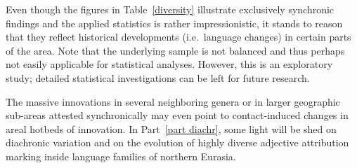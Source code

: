 Even though the figures in Table~\ref{diversity} illustrate exclusively synchronic findings and the applied statistics is rather impressionistic, it stands to reason that they reflect historical developments (i.e.~language changes) in certain parts of the area. Note that the underlying sample is not balanced and thus perhaps not easily applicable for statistical analyses. However, this is an exploratory study; detailed statistical investigations can be left for future research.

The massive innovations in several neighboring genera or in larger geographic sub-areas attested synchronically may even point to contact-induced changes in areal hotbeds of innovation. In Part~\ref{part diachr}, some light will be shed on diachronic variation and on the evolution of highly diverse adjective attribution marking inside language families of northern Eurasia.
